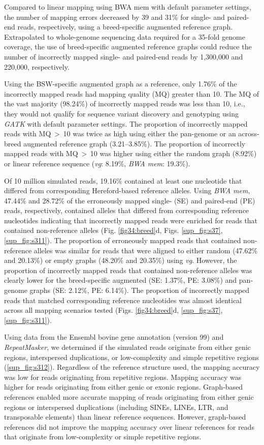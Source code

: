 \documentclass[../main.tex]{subfiles}
\begin{document}
Compared to linear mapping using BWA mem with default parameter settings, the number of mapping errors decreased by 39 and 31\% for single- and paired-end reads, respectively, using a breed-specific augmented reference graph. Extrapolated to whole-genome sequencing data required for a 35-fold genome coverage, the use of breed-specific augmented reference graphs could reduce the number of incorrectly mapped single- and paired-end reads by 1,300,000 and 220,000, respectively.

Using the BSW-specific augmented graph as a reference, only 1.76\% of the incorrectly mapped reads had mapping quality (MQ) greater than 10. The MQ of the vast majority (98.24\%) of incorrectly mapped reads was less than 10, i.e., they would not qualify for sequence variant discovery and genotyping using \emph{GATK} with default parameter settings. The proportion of incorrectly mapped reads with MQ $>$ 10 was twice as high using either the pan-genome or an across-breed augmented reference graph (3.21–3.85\%). The proportion of incorrectly mapped reads with MQ $>$ 10 was higher using either the random graph (8.92\%) or linear reference sequence (\emph{vg}: 8.19\%, \emph{BWA mem}: 19.3\%).

Of 10 million simulated reads, 19.16\% contained at least one nucleotide that differed from corresponding Hereford-based reference alleles. Using \emph{BWA mem}, 47.44\% and 28.72\% of the erroneously mapped single- (SE) and paired-end (PE) reads, respectively, contained alleles that differed from corresponding reference nucleotides indicating that incorrectly mapped reads were enriched for reads that contained non-reference alleles (Fig. \ref{fig34:breed}d, Figs. \ref{sup_fig:s37}, \ref{sup_fig:s311}). The proportion of erroneously mapped reads that contained non-reference alleles was similar for reads that were aligned to either random (47.62\% and 20.13\%) or empty graphs (48.20\% and 20.35\%) using \emph{vg}. However, the proportion of incorrectly mapped reads that contained non-reference alleles was clearly lower for the breed-specific augmented (SE: 1.37\%, PE: 3.08\%) and pan-genome graphs (SE: 2.12\%, PE: 6.14\%). The proportion of incorrectly mapped reads that matched corresponding reference nucleotides was almost identical across all mapping scenarios tested (Figs. \ref{fig34:breed}d, \ref{sup_fig:s37}, \ref{sup_fig:s311}).

Using data from the Ensembl bovine gene annotation (version 99) and \emph{RepeatMasker}, we determined if the simulated reads originate from either genic regions, interspersed duplications, or low-complexity and simple repetitive regions (\ref{sup_fig:s312}). Regardless of the reference structure used, the mapping accuracy was low for reads originating from repetitive regions. Mapping accuracy was higher for reads originating from either genic or exonic regions. Graph-based references enabled more accurate mapping of reads originating from either genic regions or interspersed duplications (including SINEs, LINEs, LTR, and transposable elements) than linear reference sequences. However, graph-based references did not improve the mapping accuracy over linear references for reads that originate from low-complexity or simple repetitive regions.
\end{document}
